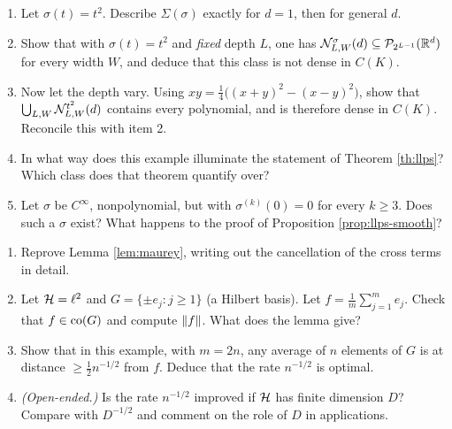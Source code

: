 \documentclass[11pt,a4paper]{article}
\begin{document}
\begin{exercise}\label{ex:poly}
\leavevmode
\begin{enumerate}[label=\textbf{\arabic*.}]
\item Let $\sigma(t) = t^2$. Describe $\Sigma(\sigma)$ exactly for $d = 1$, then for general $d$.
\item Show that with $\sigma(t) = t^2$ and \emph{fixed} depth $L$, one has
$\mathcal{N}^\sigma_{L,W}(d) \subseteq \mathcal{P}_{2^{L-1}}(\mathbb{R}^d)$ for every width $W$, and deduce that this class
is not dense in $C(K)$.
\item Now let the depth vary. Using $xy = \tfrac14\big((x+y)^2 - (x-y)^2\big)$, show that
$\bigcup_{L,W} \mathcal{N}^{t^2}_{L,W}(d)$ contains every polynomial, and is therefore dense in $C(K)$.
Reconcile this with item 2.
\item In what way does this example illuminate the statement of Theorem \ref{th:llps}? Which class
does that theorem quantify over?
\item Let $\sigma$ be $C^\infty$, nonpolynomial, but with $\sigma^{(k)}(0) = 0$ for every $k \ge 3$.
Does such a $\sigma$ exist? What happens to the proof of
Proposition \ref{prop:llps-smooth}?
\end{enumerate}
\end{exercise}

\begin{exercise}\label{ex:maurey}
\leavevmode
\begin{enumerate}[label=\textbf{\arabic*.}]
\item Reprove Lemma \ref{lem:maurey}, writing out the cancellation of the cross terms in detail.
\item Let $\mathcal{H} = \ell^2$ and $G = \{\pm e_j : j \ge 1\}$ (a Hilbert basis). Let
$f = \frac1m \sum_{j=1}^m e_j$. Check that $f \in \operatorname{co}(G)$ and compute $\left\lVert f \right\rVert$. What does the lemma
give?
\item Show that in this example, with $m = 2n$, any average of $n$ elements of $G$ is at distance
$\ge \tfrac12 n^{-1/2}$ from $f$. Deduce that the rate $n^{-1/2}$ is optimal.
\item \emph{(Open-ended.)} Is the rate $n^{-1/2}$ improved if $\mathcal{H}$ has finite dimension $D$?
Compare with $D^{-1/2}$ and comment on the role of $D$ in applications.
\end{enumerate}
\end{exercise}
\end{document}
